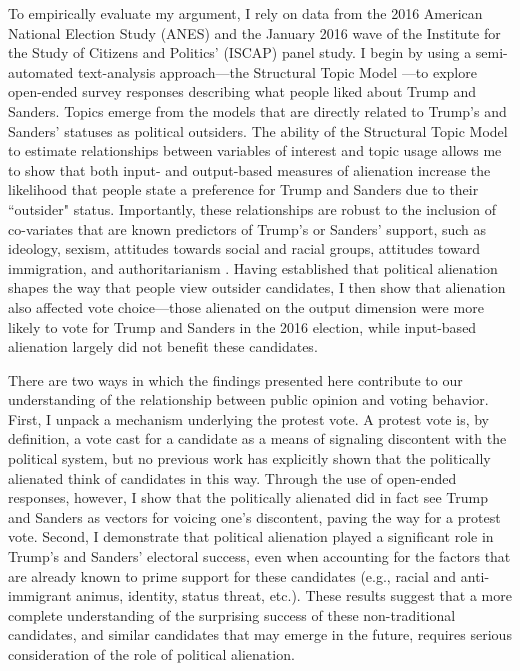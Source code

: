 \documentclass[12pt]{article}
\begin{document}
 To empirically evaluate my argument, I rely on data from the 2016 American National Election Study (ANES) and the January 2016 wave of the Institute for the Study of Citizens and Politics' (ISCAP) panel study. I begin by using a semi-automated text-analysis approach---the Structural Topic Model \parencite{roberts2014structural}---to explore open-ended survey responses describing what people liked about Trump and Sanders. Topics emerge from the models that are directly related to Trump's and Sanders' statuses as political outsiders. The ability of the Structural Topic Model to estimate relationships between variables of interest and topic usage allows me to show that both input- and output-based measures of alienation increase the likelihood that people state a preference for Trump and Sanders due to their ``outsider" status.  Importantly, these relationships are robust to the inclusion of co-variates that are known predictors of Trump's or Sanders' support, such as ideology, sexism, attitudes towards social and racial groups, attitudes toward immigration, and authoritarianism \parencite{hooghe2018explaining,dyck2018primary,mason2021activating,sides2018identity,mutz2018status,knuckey2020authoritarianism}. Having established that political alienation shapes the way that people view outsider candidates, I then show that alienation also affected vote choice---those alienated on the output dimension were more likely to vote for Trump and Sanders in the 2016 election, while input-based alienation largely did not benefit these candidates. 

There are two ways in which the findings presented here contribute to our understanding of the relationship between public opinion and voting behavior.  First, I unpack a mechanism underlying the protest vote. A protest vote is, by definition, a vote cast for a candidate as a means of signaling discontent with the political system, but no previous work has explicitly shown that the politically alienated think of candidates in this way. Through the use of open-ended responses, however, I show that the politically alienated did in fact see Trump and Sanders as vectors for voicing one's discontent, paving the way for a protest vote. Second, I demonstrate that political alienation played a significant role in Trump's and Sanders' electoral success, even when accounting for the factors that are already known to prime support for these candidates (e.g., racial and anti-immigrant animus, identity, status threat, etc.). These results suggest that a more complete understanding of the surprising success of these non-traditional candidates, and similar candidates that may emerge in the future, requires serious consideration of the role of political alienation. %
\end{document}
